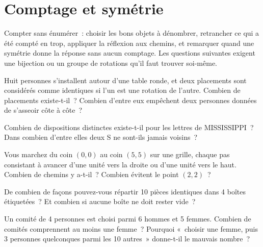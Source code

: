 \chapter{Comptage et symétrie}\label{ch:iv1:counting-and-symmetry}

\begin{ivtrains}
Compter sans énumérer~: choisir les bons objets à dénombrer, retrancher ce qui a été compté en trop, appliquer la réflexion aux chemins, et remarquer
quand une symétrie donne la réponse sans aucun comptage. Les questions suivantes exigent une bijection ou un groupe de rotations
qu'il faut trouver soi-même.
\end{ivtrains}

\begin{question}\label{iq:iv1:counting-and-symmetry:1}
Huit personnes s'installent autour d'une table ronde, et deux placements sont considérés comme identiques si l'un est une rotation de l'autre. Combien de placements existe-t-il~? Combien d'entre eux empêchent deux personnes données de s'asseoir côte à côte~?
\end{question}

\begin{question}\label{iq:iv1:counting-and-symmetry:2}
Combien de dispositions distinctes existe-t-il pour les lettres de MISSISSIPPI~? Dans combien d'entre elles deux S ne sont-ils jamais voisins~?
\end{question}

\begin{question}\label{iq:iv1:counting-and-symmetry:3}
Vous marchez du coin $(0, 0)$ au coin $(5, 5)$ sur une grille, chaque pas consistant à avancer d'une unité vers la droite ou d'une unité vers le haut. Combien de chemins y a-t-il~? Combien évitent le point $(2, 2)$~?
\end{question}

\begin{question}\label{iq:iv1:counting-and-symmetry:4}
De combien de façons pouvez-vous répartir 10 pièces identiques dans 4 boîtes étiquetées~? Et combien si aucune boîte ne doit rester vide~?
\end{question}

\begin{question}\label{iq:iv1:counting-and-symmetry:5}
Un comité de 4 personnes est choisi parmi 6 hommes et 5 femmes. Combien de comités comprennent au moins une femme~? Pourquoi «~choisir une femme, puis 3 personnes quelconques parmi les 10 autres~» donne-t-il le mauvais nombre~?
\end{question}

